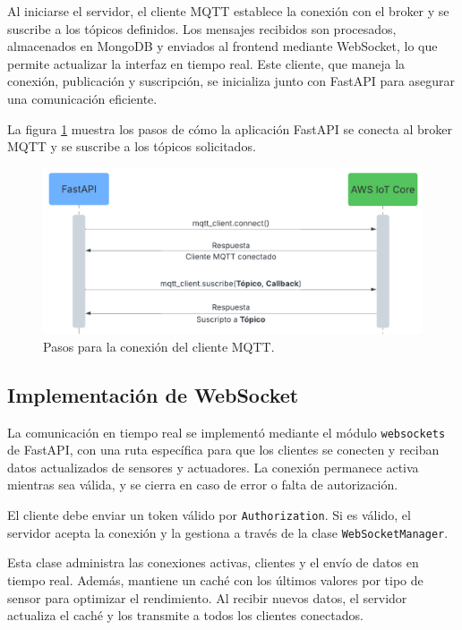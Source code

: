 Al iniciarse el servidor, el cliente MQTT establece la conexión con el broker y
se suscribe a los tópicos definidos. Los mensajes recibidos son procesados,
almacenados en MongoDB y enviados al frontend mediante WebSocket, lo que
permite actualizar la interfaz en tiempo real. Este cliente, que maneja la
conexión, publicación y suscripción, se inicializa junto con FastAPI para
asegurar una comunicación eficiente.

La figura \ref{fig:cliente_mqtt} muestra los pasos de cómo la aplicación
FastAPI se conecta al broker MQTT y se suscribe a los tópicos solicitados.

\begin{figure}[H]
    \centering
    \includegraphics[width=.75\textwidth]{./Images/22.png}
    \caption{Pasos para la conexión del cliente MQTT.}
    \label{fig:cliente_mqtt}
\end{figure}


\subsection{Implementación de WebSocket}

La comunicación en tiempo real se implementó mediante el módulo
\texttt{websockets} de FastAPI, con una ruta específica para que los clientes
se conecten y reciban datos actualizados de sensores y actuadores. La conexión
permanece activa mientras sea válida, y se cierra en caso de error o falta de
autorización.

El cliente debe enviar un token válido por \texttt{Authorization}. Si es
válido, el servidor acepta la conexión y la gestiona a través de la clase
\texttt{WebSocketManager}.

Esta clase administra las conexiones activas, clientes y el envío de datos en
tiempo real. Además, mantiene un caché con los últimos valores por tipo de
sensor para optimizar el rendimiento. Al recibir nuevos datos, el servidor
actualiza el caché y los transmite a todos los clientes conectados.


